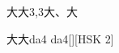 \begin{entry}{大大}{3,3}{⼤、⼤}
  \begin{phonetics}{大大}{da4 da4}[][HSK 2]
  \end{phonetics}
\end{entry}
